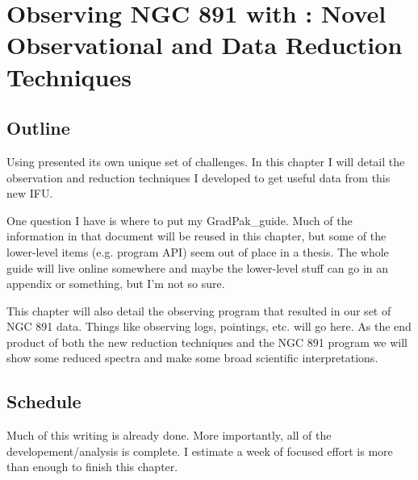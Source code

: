 \chapter[Using \GP]{Observing NGC 891 with \GP: Novel Observational and Data Reduction Techniques}
\label{chap:gradpak_obs}



\section{Outline}
Using \GP presented its own unique set of challenges. In this chapter I will
detail the observation and reduction techniques I developed to get useful data
from this new IFU.

One question I have is where to put my GradPak\_guide. Much of the information
in that document will be reused in this chapter, but some of the lower-level
items (e.g. program API) seem out of place in a thesis. The whole guide will
live online somewhere and maybe the lower-level stuff can go in an appendix or
something, but I'm not so sure.

This chapter will also detail the observing program that resulted in our set
of NGC 891 data. Things like observing logs, pointings, etc. will go here. As
the end product of both the new reduction techniques and the NGC 891 program
we will show some reduced spectra and make some broad scientific
interpretations.

\section{Schedule}
Much of this writing is already done. More importantly, all of the
developement/analysis is complete. I estimate a week of focused effort is more
than enough to finish this chapter.



